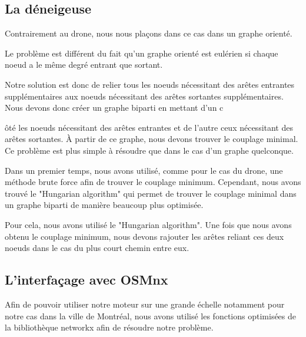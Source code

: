 \documentclass{article}
\begin{document}
\newpage

\subsection{La déneigeuse}

Contrairement au drone, nous nous plaçons dans ce cas dans un graphe orienté.

\newline

Le problème est différent du fait qu'un graphe orienté est eulérien si chaque noeud a le même degré entrant que sortant.

\vspace{0.3cm}

\newline

Notre solution est donc de relier tous les noeuds nécessitant des arêtes entrantes supplémentaires aux noeuds nécessitant des arêtes sortantes supplémentaires. Nous devons donc créer un graphe biparti en mettant d'un c

ôté les noeuds nécessitant des arêtes entrantes et de l'autre ceux nécessitant des arêtes sortantes. À partir de ce graphe, nous devons trouver le couplage minimal. Ce problème est plus simple à résoudre que dans le cas d'un graphe quelconque.

\vspace{0.3cm}

\newline

Dans un premier temps, nous avons utilisé, comme pour le cas du drone, une méthode brute force afin de trouver le couplage minimum. Cependant, nous avons trouvé le "Hungarian algorithm" qui permet de trouver le couplage minimal dans un graphe biparti de manière beaucoup plus optimisée.

Pour cela, nous avons utilisé le "Hungarian algorithm". Une fois que nous avons obtenu le couplage minimum, nous devons rajouter les arêtes reliant ces deux noeuds dans le cas du plus court chemin entre eux.



\subsection{L'interfaçage avec OSMnx}

Afin de pouvoir utiliser notre moteur sur une grande échelle notamment pour notre cas dans la ville de Montréal, nous avons utilisé les fonctions optimisées de la bibliothèque networkx afin de résoudre notre problème.
\end{document}
